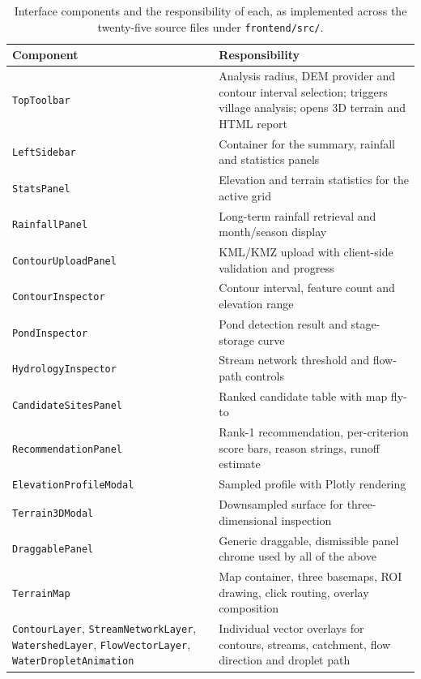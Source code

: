 \documentclass[sigconf,review,10pt]{acmart}
\newcommand{\codelong}[1]{\texttt{#1}}
\begin{document}
\begin{table}[t]
\caption{Interface components and the responsibility of each, as
implemented across the twenty-five source files under
\texttt{frontend/src/}.}
\label{tab:ui}
\small
\begin{tabular}{@{}R{4.6cm}R{11.9cm}@{}}
\toprule
\textbf{Component} & \textbf{Responsibility} \\
\midrule
\texttt{TopToolbar} & Analysis radius, DEM provider and contour interval selection; triggers village analysis; opens 3D terrain and HTML report \\
\texttt{LeftSidebar} & Container for the summary, rainfall and statistics panels \\
\texttt{StatsPanel} & Elevation and terrain statistics for the active grid \\
\texttt{RainfallPanel} & Long-term rainfall retrieval and month/season display \\
\texttt{ContourUploadPanel} & KML/KMZ upload with client-side validation and progress \\
\texttt{ContourInspector} & Contour interval, feature count and elevation range \\
\texttt{PondInspector} & Pond detection result and stage-storage curve \\
\texttt{HydrologyInspector} & Stream network threshold and flow-path controls \\
\texttt{CandidateSitesPanel} & Ranked candidate table with map fly-to \\
\texttt{RecommendationPanel} & Rank-1 recommendation, per-criterion score bars, reason strings, runoff estimate \\
\codelong{ElevationProfileModal} & Sampled profile with Plotly rendering \\
\texttt{Terrain3DModal} & Downsampled surface for three-dimensional inspection \\
\texttt{DraggablePanel} & Generic draggable, dismissible panel chrome used by all of the above \\
\texttt{TerrainMap} & Map container, three basemaps, ROI drawing, click routing, overlay composition \\
\texttt{ContourLayer}, \texttt{StreamNetworkLayer}, \texttt{WatershedLayer}, \texttt{FlowVectorLayer}, \codelong{WaterDropletAnimation} & Individual vector overlays for contours, streams, catchment, flow direction and droplet path \\
\bottomrule
\end{tabular}
\end{table}
\end{document}
